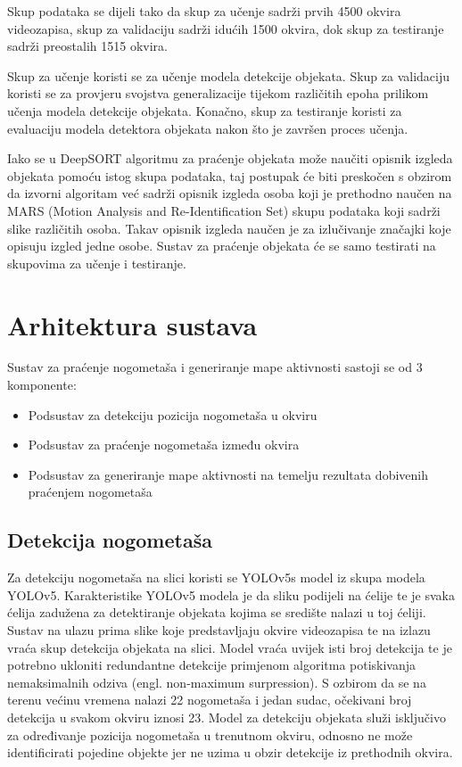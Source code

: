 \documentclass[times, utf8, seminar, numeric]{fer}
\begin{document}
Skup podataka se dijeli tako da skup za učenje sadrži prvih 4500 okvira videozapisa, skup za validaciju sadrži idućih 1500 okvira, dok skup za testiranje sadrži preostalih 1515 okvira. 

Skup za učenje koristi se za učenje modela detekcije objekata. 
Skup za validaciju koristi se za provjeru svojstva generalizacije tijekom različitih epoha prilikom učenja modela detekcije objekata. 
Konačno, skup za testiranje koristi za evaluaciju modela detektora objekata nakon što je završen proces učenja. 

Iako se u DeepSORT algoritmu za praćenje objekata može naučiti opisnik izgleda objekata pomoću istog skupa podataka, taj postupak će biti preskočen s obzirom da izvorni algoritam već sadrži opisnik izgleda osoba koji je prethodno naučen na MARS (Motion Analysis and Re-Identification Set) skupu podataka koji sadrži slike različitih osoba. Takav opisnik izgleda naučen je za izlučivanje značajki koje opisuju izgled jedne osobe. 
Sustav za praćenje objekata će se samo testirati na skupovima za učenje i testiranje.




\chapter{Arhitektura sustava}

Sustav za praćenje nogometaša i generiranje mape aktivnosti sastoji se od 3 komponente:
\begin{itemize}
	\item Podsustav za detekciju pozicija nogometaša u okviru
	\item Podsustav za praćenje nogometaša između okvira
	\item Podsustav za generiranje mape aktivnosti na temelju rezultata dobivenih praćenjem nogometaša
\end{itemize}


\section{Detekcija nogometaša}
Za detekciju nogometaša na slici koristi se YOLOv5s model iz skupa modela YOLOv5. Karakteristike YOLOv5 modela je da sliku podijeli na ćelije te je svaka ćelija zadužena za detektiranje objekata kojima se središte nalazi u toj ćeliji. Sustav na ulazu prima slike koje predstavljaju okvire videozapisa te na izlazu vraća skup detekcija objekata na slici. Model vraća uvijek isti broj detekcija te je potrebno ukloniti redundantne detekcije primjenom algoritma potiskivanja nemaksimalnih odziva (engl. non-maximum surpression). S ozbirom da se na terenu većinu vremena nalazi 22 nogometaša i jedan sudac, očekivani broj detekcija u svakom okviru iznosi 23. Model za detekciju objekata služi isključivo za određivanje pozicija nogometaša u trenutnom okviru, odnosno ne može identificirati pojedine objekte jer ne uzima u obzir detekcije iz prethodnih okvira. 	
\end{document}
